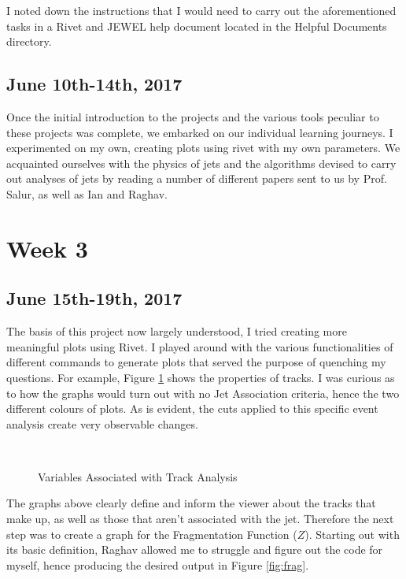 \documentclass{article}
\begin{document}
I noted down the instructions that I would need to carry out the aforementioned tasks in a Rivet and JEWEL help document located in the Helpful Documents directory.

\subsection{June 10th-14th, 2017}
Once the initial introduction to the projects and the various tools peculiar to these projects was complete, we embarked on our individual learning journeys. I experimented on my own, creating plots using rivet with my own parameters.
We acquainted ourselves with the physics of jets and the algorithms devised to carry out analyses of jets by reading a number of different papers sent to us by Prof. Salur, as well as Ian and Raghav.

\newpage

\section{Week 3}

\subsection{June 15th-19th, 2017}
The basis of this project now largely understood, I tried creating more meaningful plots using Rivet. I played around with the various functionalities of different commands to generate plots that served the purpose of quenching my questions. For example, Figure \ref{fig:trackvars} shows the properties of tracks. I was curious as to how the graphs would turn out with no Jet Association criteria, hence the two different colours of plots. As is evident, the cuts applied to this specific event analysis create very observable changes.

\begin{figure}[H]
\centering
{} 
\\
\caption{Variables Associated with Track Analysis}
\label{fig:trackvars}
\end{figure}

The graphs above clearly define and inform the viewer about the tracks that make up, as well as those that aren't associated with the jet. Therefore the next step was to create a graph for the Fragmentation Function ($Z$). Starting out with its basic definition, Raghav allowed me to struggle and figure out the code for myself, hence producing the desired output in Figure \ref{fig:frag}.
  
\end{document}
